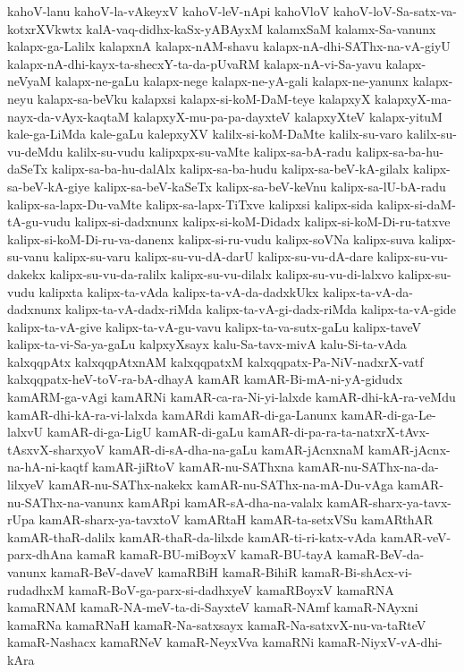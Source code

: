 {kahoV-lanu
kahoV-la-vAkeyxV
kahoV-leV-nApi
kahoVloV
kahoV-loV-Sa-satx-va-kotxrXVkwtx
kalA-vaq-didhx-kaSx-yABAyxM
kalamxSaM
kalamx-Sa-vanunx
kalapx-ga-Lalilx
kalapxnA
kalapx-nAM-shavu
kalapx-nA-dhi-SAThx-na-vA-giyU
kalapx-nA-dhi-kayx-ta-shecxY-ta-da-pUvaRM
kalapx-nA-vi-Sa-yavu
kalapx-neVyaM
kalapx-ne-gaLu
kalapx-nege
kalapx-ne-yA-gali
kalapx-ne-yanunx
kalapx-neyu
kalapx-sa-beVku
kalapxsi
kalapx-si-koM-DaM-teye
kalapxyX
kalapxyX-ma-nayx-da-vAyx-kaqtaM
kalapxyX-mu-pa-pa-dayxteV
kalapxyXteV
kalapx-yituM
kale-ga-LiMda
kale-gaLu
kalepxyXV
kalilx-si-koM-DaMte
kalilx-su-varo
kalilx-su-vu-deMdu
kalilx-su-vudu
kalipxpx-su-vaMte
kalipx-sa-bA-radu
kalipx-sa-ba-hu-daSeTx
kalipx-sa-ba-hu-dalAlx
kalipx-sa-ba-hudu
kalipx-sa-beV-kA-gilalx
kalipx-sa-beV-kA-giye
kalipx-sa-beV-kaSeTx
kalipx-sa-beV-keVnu
kalipx-sa-lU-bA-radu
kalipx-sa-lapx-Du-vaMte
kalipx-sa-lapx-TiTxve
kalipxsi
kalipx-sida
kalipx-si-daM-tA-gu-vudu
kalipx-si-dadxnunx
kalipx-si-koM-Didadx
kalipx-si-koM-Di-ru-tatxve
kalipx-si-koM-Di-ru-va-danenx
kalipx-si-ru-vudu
kalipx-soVNa
kalipx-suva
kalipx-su-vanu
kalipx-su-varu
kalipx-su-vu-dA-darU
kalipx-su-vu-dA-dare
kalipx-su-vu-dakekx
kalipx-su-vu-da-ralilx
kalipx-su-vu-dilalx
kalipx-su-vu-di-lalxvo
kalipx-su-vudu
kalipxta
kalipx-ta-vAda
kalipx-ta-vA-da-dadxkUkx
kalipx-ta-vA-da-dadxnunx
kalipx-ta-vA-dadx-riMda
kalipx-ta-vA-gi-dadx-riMda
kalipx-ta-vA-gide
kalipx-ta-vA-give
kalipx-ta-vA-gu-vavu
kalipx-ta-va-sutx-gaLu
kalipx-taveV
kalipx-ta-vi-Sa-ya-gaLu
kalpxyXsayx
kalu-Sa-tavx-mivA
kalu-Si-ta-vAda
kalxqqpAtx
kalxqqpAtxnAM
kalxqqpatxM
kalxqqpatx-Pa-NiV-nadxrX-vatf
kalxqqpatx-heV-toV-ra-bA-dhayA
kamAR
kamAR-Bi-mA-ni-yA-gidudx
kamARM-ga-vAgi
kamARNi
kamAR-ca-ra-Ni-yi-lalxde
kamAR-dhi-kA-ra-veMdu
kamAR-dhi-kA-ra-vi-lalxda
kamARdi
kamAR-di-ga-Lanunx
kamAR-di-ga-Le-lalxvU
kamAR-di-ga-LigU
kamAR-di-gaLu
kamAR-di-pa-ra-ta-natxrX-tAvx-tAsxvX-sharxyoV
kamAR-di-sA-dha-na-gaLu
kamAR-jAcnxnaM
kamAR-jAcnx-na-hA-ni-kaqtf
kamAR-jiRtoV
kamAR-nu-SAThxna
kamAR-nu-SAThx-na-da-lilxyeV
kamAR-nu-SAThx-nakekx
kamAR-nu-SAThx-na-mA-Du-vAga
kamAR-nu-SAThx-na-vanunx
kamARpi
kamAR-sA-dha-na-valalx
kamAR-sharx-ya-tavx-rUpa
kamAR-sharx-ya-tavxtoV
kamARtaH
kamAR-ta-setxVSu
kamARthAR
kamAR-thaR-dalilx
kamAR-thaR-da-lilxde
kamAR-ti-ri-katx-vAda
kamAR-veV-parx-dhAna
kamaR
kamaR-BU-miBoyxV
kamaR-BU-tayA
kamaR-BeV-da-vanunx
kamaR-BeV-daveV
kamaRBiH
kamaR-BihiR
kamaR-Bi-shAcx-vi-rudadhxM
kamaR-BoV-ga-parx-si-dadhxyeV
kamaRBoyxV
kamaRNA
kamaRNAM
kamaR-NA-meV-ta-di-SayxteV
kamaR-NAmf
kamaR-NAyxni
kamaRNa
kamaRNaH
kamaR-Na-satxsayx
kamaR-Na-satxvX-nu-va-taRteV
kamaR-Nashacx
kamaRNeV
kamaR-NeyxVva
kamaRNi
kamaR-NiyxV-vA-dhi-kAra
}
